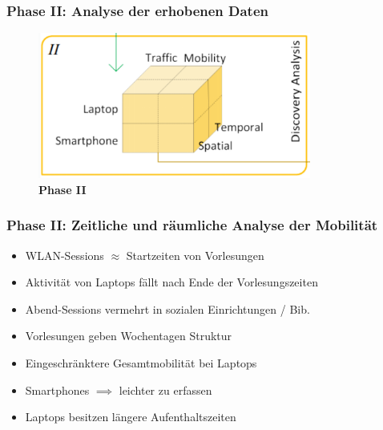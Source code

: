 \documentclass{beamer}
\begin{document}
\begin{frame}
  \frametitle{Phase II: Analyse der erhobenen Daten}
  \begin{figure}
    \centering
    \includegraphics[width=0.8\textwidth]{images/phase2.png}
    \caption*{\textbf{Phase II}}
  \end{figure}  
\end{frame}

\begin{frame}
  \frametitle{Phase II: Zeitliche und räumliche Analyse der Mobilität}
  \begin{itemize}
    \item WLAN-Sessions $\approx$ Startzeiten von Vorlesungen
    \item Aktivität von Laptops fällt nach Ende der Vorlesungszeiten
    \item Abend-Sessions vermehrt in sozialen Einrichtungen / Bib.
    \item Vorlesungen geben Wochentagen Struktur
    \item Eingeschränktere Gesamtmobilität bei Laptops
    \item Smartphones  $\implies$ leichter zu erfassen
    \item Laptops besitzen längere Aufenthaltszeiten 
  \end{itemize}
\end{frame}
\end{document}
